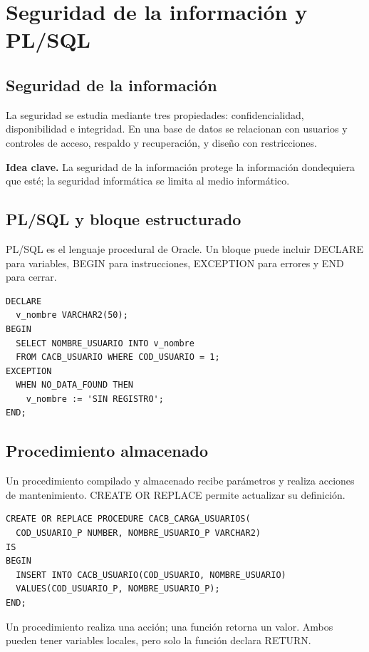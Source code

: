 \documentclass[10pt,letterpaper]{article}
\newenvironment{ideaclave}[1][Idea clave]
  {\par\smallskip\begingroup\raggedright
   \noindent\textcolor{turquesa}{\textbf{#1.}}\enspace}
  {\par\endgroup\smallskip}
\begin{document}
\section{Seguridad de la información y PL/SQL}
\subsection{Seguridad de la información}
La seguridad se estudia mediante tres propiedades: confidencialidad,
disponibilidad e integridad. En una base de datos se relacionan con usuarios y
controles de acceso, respaldo y recuperación, y diseño con restricciones.
\begin{ideaclave}
La seguridad de la información protege la información dondequiera que esté;
la seguridad informática se limita al medio informático.
\end{ideaclave}
\subsection{PL/SQL y bloque estructurado}
PL/SQL es el lenguaje procedural de Oracle. Un bloque puede incluir DECLARE para
variables, BEGIN para instrucciones, EXCEPTION para errores y END para cerrar.
\begin{lstlisting}
DECLARE
  v_nombre VARCHAR2(50);
BEGIN
  SELECT NOMBRE_USUARIO INTO v_nombre
  FROM CACB_USUARIO WHERE COD_USUARIO = 1;
EXCEPTION
  WHEN NO_DATA_FOUND THEN
    v_nombre := 'SIN REGISTRO';
END;
\end{lstlisting}
\subsection{Procedimiento almacenado}
Un procedimiento compilado y almacenado recibe parámetros y realiza acciones
de mantenimiento. CREATE OR REPLACE permite actualizar su definición.
\begin{lstlisting}
CREATE OR REPLACE PROCEDURE CACB_CARGA_USUARIOS(
  COD_USUARIO_P NUMBER, NOMBRE_USUARIO_P VARCHAR2)
IS
BEGIN
  INSERT INTO CACB_USUARIO(COD_USUARIO, NOMBRE_USUARIO)
  VALUES(COD_USUARIO_P, NOMBRE_USUARIO_P);
END;
\end{lstlisting}
\begin{precaucion}
Un procedimiento realiza una acción; una función retorna un valor. Ambos pueden
tener variables locales, pero solo la función declara RETURN.
\end{precaucion}
\end{document}
